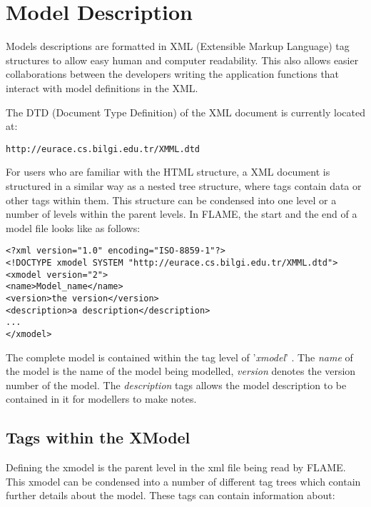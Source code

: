 \section{Model Description}
\label{model_description}

Models descriptions are formatted in XML (Extensible Markup Language) tag
structures to allow easy human and computer readability. This also allows easier collaborations between the
developers writing the application functions that interact with model definitions in the XML.

The DTD (Document Type Definition) of the XML document is currently located
at:

\begin{mylisting}
\begin{verbatim}
http://eurace.cs.bilgi.edu.tr/XMML.dtd
\end{verbatim}
\end{mylisting}

For users who are familiar with the HTML structure, a XML document is structured in a similar way as a nested tree structure, where tags contain data or other tags within them. This structure can be condensed into one level or a number of levels within the parent levels. In FLAME, the start and the end of a model file looks like as follows:

\begin{mylisting}
\begin{verbatim}
<?xml version="1.0" encoding="ISO-8859-1"?>
<!DOCTYPE xmodel SYSTEM "http://eurace.cs.bilgi.edu.tr/XMML.dtd">
<xmodel version="2">
<name>Model_name</name>
<version>the version</version>
<description>a description</description>
...
</xmodel>
\end{verbatim}
\end{mylisting}

The complete model is contained within the tag level of '\emph{xmodel}' . The \emph{name} of the model is the name of the model being modelled, \emph{version} denotes the version number of the model. The \emph{description} tags allows the model description to be contained in it for modellers to make notes. 

\subsection{Tags within the XModel}
Defining the xmodel is the parent level in the xml file being read by FLAME. This xmodel can be condensed into a number of different tag trees which contain further details about the model. These tags can contain information about:

